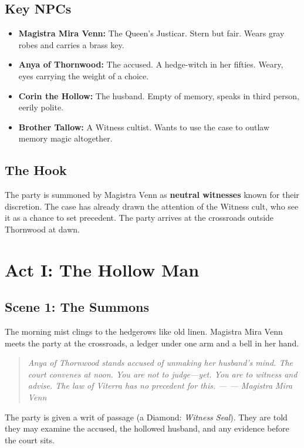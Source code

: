 \documentclass[12pt]{book}
\newcommand{\letter}[2]{%
    \begin{quote}\small\itshape #1 \hfill --- #2\end{quote}}
\begin{document}
\section{Key NPCs}

\begin{itemize}
    \item \textbf{Magistra Mira Venn:} The Queen's Justicar. Stern but fair. Wears gray robes and carries a brass key.
    \item \textbf{Anya of Thornwood:} The accused. A hedge-witch in her fifties. Weary, eyes carrying the weight of a choice.
    \item \textbf{Corin the Hollow:} The husband. Empty of memory, speaks in third person, eerily polite.
    \item \textbf{Brother Tallow:} A Witness cultist. Wants to use the case to outlaw memory magic altogether.
\end{itemize}

\section{The Hook}

The party is summoned by Magistra Venn as \textbf{neutral witnesses} known for their discretion. The case has already drawn the attention of the Witness cult, who see it as a chance to set precedent. The party arrives at the crossroads outside Thornwood at dawn.

\chapter{Act I: The Hollow Man}

\section{Scene 1: The Summons}

The morning mist clings to the hedgerows like old linen. Magistra Mira Venn meets the party at the crossroads, a ledger under one arm and a bell in her hand.

\letter{Anya of Thornwood stands accused of unmaking her husband's mind. The court convenes at noon. You are not to judge---yet. You are to witness and advise. The law of Viterra has no precedent for this.}{--- Magistra Mira Venn}

The party is given a writ of passage (a Diamond: \textit{Witness Seal}). They are told they may examine the accused, the hollowed husband, and any evidence before the court sits.
\end{document}
